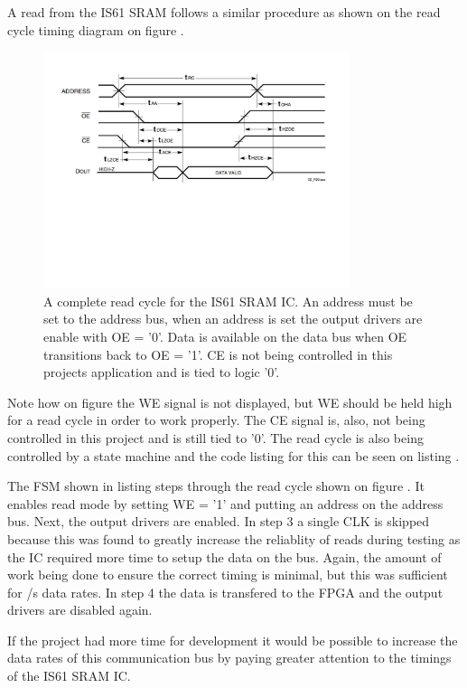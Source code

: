 A read from the IS61 SRAM follows a similar procedure as shown on the read cycle timing diagram on figure .
\begin{figure}[H]
    \centering
    \includegraphics[clip, trim=0 250 0 0, width=0.8\textwidth]{Sections/7_SystemDesign/Figures/7_2_5_IS61_ReadCycle.pdf}
    \caption{A complete read cycle for the IS61 SRAM IC\cite{ISSISRAM}. An address must be set to the address bus, when an address is set the output drivers are enable with OE = '0'. Data is available on the data bus when OE transitions back to OE = '1'. CE is not being controlled in this projects application and is tied to logic '0'.}
    \label{fig:7_2_5_IS61_READ}
\end{figure}

Note how on figure  the WE signal is not displayed, but WE should be held high for a read cycle in order to work properly. The CE signal is, also, not being controlled in this project and is still tied to '0'. The read cycle is also being controlled by a state machine and the code listing for this can be seen on listing .

 

The FSM shown in listing  steps through the read cycle shown on figure . It enables read mode by setting WE = '1' and putting an address on the address bus. Next, the output drivers are enabled. In step 3 a single CLK is skipped because this was found to greatly increase the reliablity of reads during testing as the IC required more time to setup the data on the bus. Again, the amount of work being done to ensure the correct timing is minimal, but this was sufficient for /s data rates. In step 4 the data is transfered to the FPGA and the output drivers are disabled again.

If the project had more time for development it would be possible to increase the data rates of this communication bus by paying greater attention to the timings of the IS61 SRAM IC.